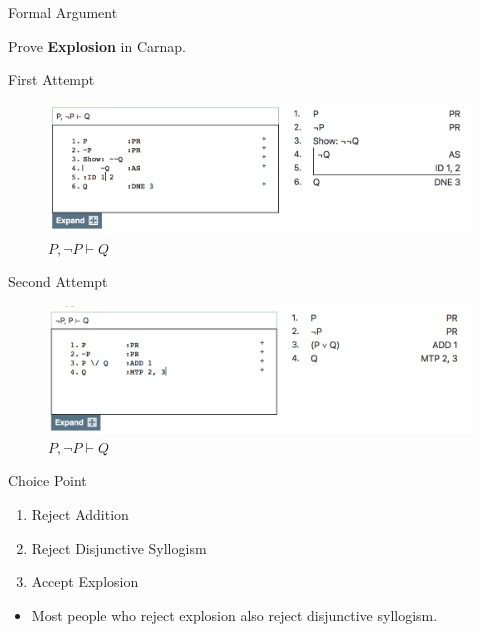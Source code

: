 \documentclass[
  ignorenonframetext,
]{beamer}
\providecommand{\tightlist}{%
  \setlength{\itemsep}{0pt}\setlength{\parskip}{0pt}}
\renewcommand{\,}{\text{, }}
\begin{document}
\begin{frame}{Formal Argument}
\protect\hypertarget{formal-argument}{}

Prove \textbf{Explosion} in Carnap.

\end{frame}

\begin{frame}{First Attempt}
\protect\hypertarget{first-attempt}{}

\begin{figure}
\centering
\includegraphics{../images/class05/Class-05-5.png}
\caption{\(P, \neg P \vdash Q\)}
\end{figure}

\end{frame}

\begin{frame}{Second Attempt}
\protect\hypertarget{second-attempt}{}

\begin{figure}
\centering
\includegraphics{../images/class05/Class-05-6.png}
\caption{\(P, \neg P \vdash Q\)}
\end{figure}

\end{frame}

\begin{frame}{Choice Point}
\protect\hypertarget{choice-point}{}

\begin{enumerate}
\tightlist
\item
  Reject Addition
\item
  Reject Disjunctive Syllogism
\item
  Accept Explosion
\end{enumerate}

\begin{itemize}[<+->]
\tightlist
\item
  Most people who reject explosion also reject disjunctive syllogism.
\end{itemize}

\end{frame}
\end{document}
